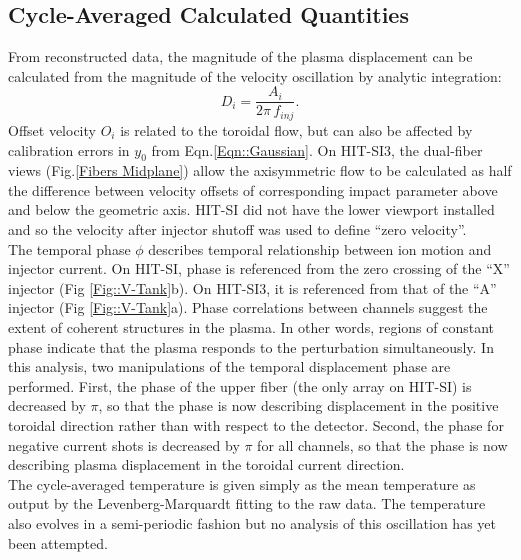 \subsection{Cycle-Averaged Calculated Quantities}\label{sec::CalcQuant}
From reconstructed data, the magnitude of the plasma displacement can be calculated from the magnitude of the velocity oscillation by analytic integration:
\begin{equation}
D_i=\frac{A_i}{{2\pi}\,f_{inj}}.
\end{equation}
Offset velocity $O_i$ is related to the toroidal flow, but can also be affected by calibration errors in $y_0$ from Eqn.\ref{Eqn::Gaussian}. On HIT-SI3, the dual-fiber views (Fig.\ref{Fibers Midplane}) allow the axisymmetric flow to be calculated as half the difference between velocity offsets of corresponding impact parameter above and below the geometric axis. HIT-SI did not have the lower viewport installed and so the velocity after injector shutoff was used to define ``zero velocity''.\\
\hspace*{4ex}The temporal phase $\phi$ describes temporal relationship between ion motion and injector current. On HIT-SI, phase is referenced from the zero crossing of the ``X'' injector (Fig \ref{Fig::V-Tank}b). On HIT-SI3, it is referenced from that of the ``A'' injector (Fig \ref{Fig::V-Tank}a). Phase correlations between channels suggest the extent of coherent structures in the plasma. In other words, regions of constant phase indicate that the plasma responds to the perturbation simultaneously.  In this analysis, two manipulations of the temporal displacement phase are performed. First, the phase of the upper fiber (the only array on HIT-SI) is decreased by $\pi$, so that the phase is now describing displacement in the positive toroidal direction rather than with respect to the detector. Second, the phase for negative current shots is decreased by $\pi$ for all channels, so that the phase is now describing plasma displacement in the toroidal current direction.   \\
\hspace*{4ex}The cycle-averaged temperature is given simply as the mean temperature as output by the Levenberg-Marquardt fitting to the raw data. The temperature also evolves in a semi-periodic fashion but no analysis of this oscillation has yet been attempted.

